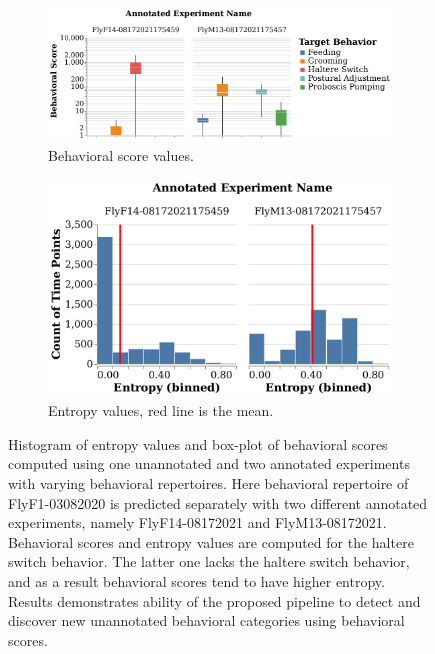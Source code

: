 \begin{figure}[ht!]
	\centering
	\begin{subfigure}[h]{0.55\linewidth}
		\centering\includegraphics[width=\linewidth]{figures/BehavioralScores-RepertoireDifference.pdf}
		\caption{Behavioral score values.}
	\end{subfigure}%
	\centering
	\begin{subfigure}[h]{0.45\linewidth}
		\centering\includegraphics[width=\linewidth]{figures/Entropy-RepertoireDifference.pdf}
		\caption{Entropy values, red line is the mean.}
	\end{subfigure}%
	\caption[Histogram of entropy values and box-plot of the behavioral scores computed using one unannotated and two annotated experiments with varying behavioral repertoires.]{Histogram of entropy values and box-plot of behavioral scores computed using one unannotated and two annotated experiments with varying behavioral repertoires.
		Here behavioral repertoire of FlyF1-03082020 is predicted separately with two different annotated experiments, namely FlyF14-08172021 and FlyM13-08172021.
		Behavioral scores and entropy values are computed for the haltere switch behavior.
		The latter one lacks the haltere switch behavior, and as a result behavioral scores tend to have higher entropy.
		Results demonstrates ability of the proposed pipeline to detect and discover new unannotated behavioral categories using behavioral scores.}
\end{figure}

